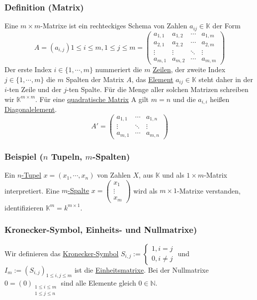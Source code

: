 \subsubsection{Definition (Matrix)}
Eine $m\times m$-Matrixe ist ein rechteckiges Schema von Zahlen $a_{ij}\in \mathbb{K}$ der Form \[A=(a_{i,j}) 1\leq i\leq m,1\leq j\leq m =\left( \begin{array}{cccc}a_{1,1}& a_{1,2}& \cdots & a_{1,m}\\ a_{2,1}& a_{2,2}& \cdots & a_{2,m} \\ \vdots & \vdots & \ddots & \vdots \\ a_{m,1}& a_{m,2}& \cdots & a_{m,m}\end{array}\right) \]
Der erste Index $i\in\{1,\cdots ,m\}$ nummeriert die $m$ \underline{Zeilen}, der zweite Index $j\in \{1,\cdots ,m\}$ die $m$ Spalten der Matrix $A$, das \underline{Element} $a_{ij}\in \mathbb{K}$ steht daher in der $i$-ten Zeile und der $j$-ten Spalte.  F\"{u}r die Menge aller solchen Matrizen schreiben wir $\mathbb{K}^{m\times m}$. Für eine \underline{quadratische Matrix} A gilt $m = n$ und die $a_{i,i}$ heißen \underline{Diagonalelement}.
\[A'=\left( \begin{array}{ccc}a_{1,1}& \cdots & a_{1,n}\\\vdots & \ddots & \vdots\\a_{m,1}& \cdots & a_{m,n}\end{array}\right)\]
\subsubsection{Beispiel ($n$ Tupeln, $m$-Spalten)}
Ein \underline{$n$-Tupel} $x=(x_1,\cdots ,x_n)$ von Zahlen $X$, aus $\mathbb{K}$ und als $1\times m$-Matrix interpretiert.  Eine \underline{$m$-Spalte} $x=\left(\begin{array}{c}x_1\\\vdots \\x_m\end{array}\right)$
wird als $m\times 1$-Matrixe verstanden, identifizieren $\mathbb{K}^m=k^{m\times 1}$.
\subsubsection{Kronecker-Symbol, Einheits- und Nullmatrixe)}
Wir definieren das \underline{Kronecker-Symbol} $S_{i,j}:=\begin{cases}1,i=j\\0,i\not= j\end{cases}$ und $I_m:=(S_{i,j})_{1\leq i,j\leq m}$ ist die \underline{Einheitsmatrixe}.  Bei der Nullmatrixe $0=(0)_{\substack{1\leq i\leq m\\1\leq j\leq n}}$ sind alle Elemente gleich $0\in \mathbb{N}$.
